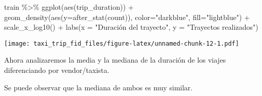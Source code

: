 \documentclass[
]{article}
\newenvironment{Shaded}{\begin{snugshade}}{\end{snugshade}}
\newcommand{\AttributeTok}[1]{\textcolor[rgb]{0.77,0.63,0.00}{#1}}
\newcommand{\FunctionTok}[1]{\textcolor[rgb]{0.00,0.00,0.00}{#1}}
\newcommand{\NormalTok}[1]{#1}
\newcommand{\SpecialCharTok}[1]{\textcolor[rgb]{0.00,0.00,0.00}{#1}}
\newcommand{\StringTok}[1]{\textcolor[rgb]{0.31,0.60,0.02}{#1}}
\begin{document}
\begin{Shaded}
\begin{Highlighting}[]
\NormalTok{train }\SpecialCharTok{\%\textgreater{}\%}
  \FunctionTok{ggplot}\NormalTok{(}\FunctionTok{aes}\NormalTok{(trip\_duration)) }\SpecialCharTok{+}
  \FunctionTok{geom\_density}\NormalTok{(}\FunctionTok{aes}\NormalTok{(}\AttributeTok{y=}\FunctionTok{after\_stat}\NormalTok{(count)), }\AttributeTok{color=}\StringTok{"darkblue"}\NormalTok{, }\AttributeTok{fill=}\StringTok{"lightblue"}\NormalTok{) }\SpecialCharTok{+}
  \FunctionTok{scale\_x\_log10}\NormalTok{() }\SpecialCharTok{+}
  \FunctionTok{labs}\NormalTok{(}\AttributeTok{x =} \StringTok{"Duración del trayecto"}\NormalTok{, }\AttributeTok{y =} \StringTok{"Trayectos realizados"}\NormalTok{)}
\end{Highlighting}
\end{Shaded}

\texttt{[image: taxi\_trip\_fid\_files/figure-latex/unnamed-chunk-12-1.pdf]}

Ahora analizaremos la media y la mediana de la duración de los viajes
diferenciando por vendor/taxista.

Se puede observar que la mediana de ambos es muy similar.
\end{document}
